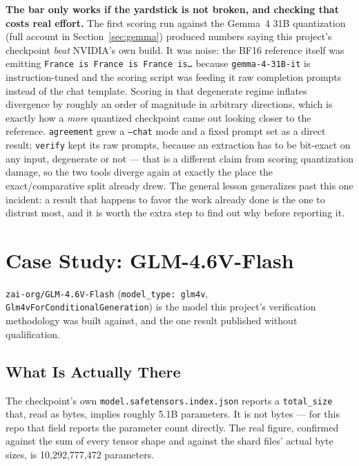 \documentclass[11pt]{article}
\begin{document}
\textbf{The bar only works if the yardstick is not broken, and checking that costs
real effort.} The first scoring run against the Gemma~4 31B quantization (full account in
Section~\ref{sec:gemma}) produced numbers saying this project's checkpoint \emph{beat}
NVIDIA's own build. It was noise: the BF16 reference itself was emitting
\texttt{France is France is France is\ldots} because \texttt{gemma-4-31B-it} is
instruction-tuned and the scoring script was feeding it raw completion prompts instead of
the chat template. Scoring in that degenerate regime inflates divergence by roughly an
order of magnitude in arbitrary directions, which is exactly how a \emph{more} quantized
checkpoint came out looking closer to the reference. \texttt{agreement} grew a
\texttt{--chat} mode and a fixed prompt set as a direct result; \texttt{verify} kept its
raw prompts, because an extraction has to be bit-exact on any input, degenerate or not ---
that is a different claim from scoring quantization damage, so the two tools diverge
again at exactly the place the exact/comparative split already drew. The general lesson
generalizes past this one incident: a result that happens to favor the work already done
is the one to distrust most, and it is worth the extra step to find out why before
reporting it.

\section{Case Study: GLM-4.6V-Flash}
\label{sec:glm}

\texttt{zai-org/GLM-4.6V-Flash} (\texttt{model\_type: glm4v},
\texttt{Glm4vForConditionalGeneration}) is the model this project's verification
methodology was built against, and the one result published without qualification.

\subsection{What Is Actually There}

The checkpoint's own \texttt{model.safetensors.index.json} reports a \texttt{total\_size}
that, read as bytes, implies roughly 5.1B parameters. It is not bytes --- for this repo
that field reports the parameter count directly. The real figure, confirmed against the
sum of every tensor shape and against the shard files' actual byte sizes, is
10{,}292{,}777{,}472 parameters.
\end{document}
